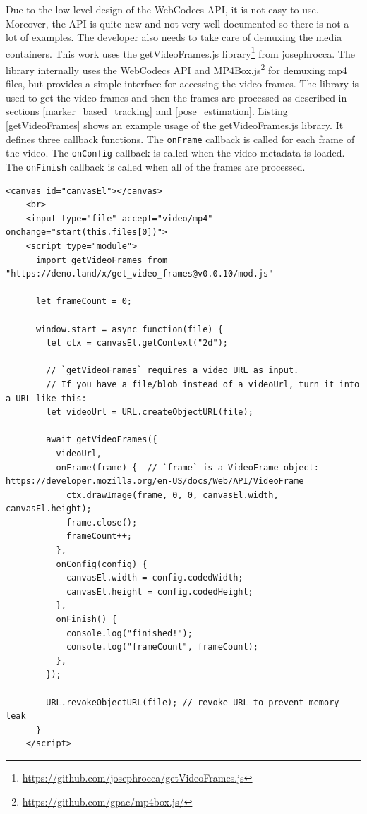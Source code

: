 Due to the low-level design of the WebCodecs API, it is not easy to use. Moreover, the API is quite new and not very well documented so there is not a lot of examples. The developer also needs to take care of demuxing the media containers. This work uses the getVideoFrames.js library\footnote{\url{https://github.com/josephrocca/getVideoFrames.js}} from josephrocca. The library internally uses the WebCodecs API and MP4Box.js\footnote{\url{https://github.com/gpac/mp4box.js/}} for demuxing mp4 files, but provides a simple interface for accessing the video frames. The library is used to get the video frames and then the frames are processed as described in sections \ref{marker_based_tracking} and \ref{pose_estimation}. Listing \ref{getVideoFrames} shows an example usage of the getVideoFrames.js library. It defines three callback functions. The \texttt{onFrame} callback is called for each frame of the video. The \texttt{onConfig} callback is called when the video metadata is loaded. The \texttt{onFinish} callback is called when all of the frames are processed.

\begin{lstlisting}[style=htmlcssjs, caption={Example usage of the getVideoFrames.js library. Taken from \url{https://github.com/josephrocca/getVideoFrames.js/}.}, label={getVideoFrames}]
    <canvas id="canvasEl"></canvas>
    <br>
    <input type="file" accept="video/mp4" onchange="start(this.files[0])">
    <script type="module">
      import getVideoFrames from "https://deno.land/x/get_video_frames@v0.0.10/mod.js"
      
      let frameCount = 0;
    
      window.start = async function(file) {
        let ctx = canvasEl.getContext("2d"); 
    
        // `getVideoFrames` requires a video URL as input.
        // If you have a file/blob instead of a videoUrl, turn it into a URL like this:
        let videoUrl = URL.createObjectURL(file);
    
        await getVideoFrames({
          videoUrl,
          onFrame(frame) {  // `frame` is a VideoFrame object: https://developer.mozilla.org/en-US/docs/Web/API/VideoFrame
            ctx.drawImage(frame, 0, 0, canvasEl.width, canvasEl.height);
            frame.close();
            frameCount++;
          },
          onConfig(config) {
            canvasEl.width = config.codedWidth;
            canvasEl.height = config.codedHeight;
          },
          onFinish() {
            console.log("finished!");
            console.log("frameCount", frameCount);
          },
        });
    
        URL.revokeObjectURL(file); // revoke URL to prevent memory leak
      }
    </script> 
\end{lstlisting}

